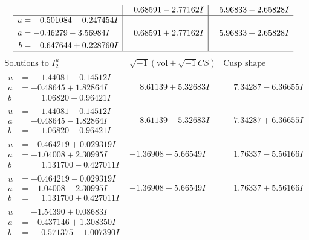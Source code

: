 \documentclass[1p]{elsarticle_modified}
\theoremstyle{definition}
\newcommand{\I}{\sqrt{-1}}
\begin{document}
$$\begin{array}{c|c|c}
 & \phantom{-}0.68591 - 2.77162 I & \phantom{-}5.96833 - 2.65828 I \\ \hline\begin{aligned}
u &= \phantom{-}0.501084 - 0.247454 I \\
a &= -0.46279 - 3.56984 I \\
b &= \phantom{-}0.647644 + 0.228760 I\end{aligned}
 & \phantom{-}0.68591 + 2.77162 I & \phantom{-}5.96833 + 2.65828 I\\
 \hline 
 \end{array}$$\newpage$$\begin{array}{c|c|c}  
\text{Solutions to }I^u_{2}& \I (\text{vol} + \sqrt{-1}CS) & \text{Cusp shape}\\
 \hline 
\begin{aligned}
u &= \phantom{-}1.44081 + 0.14512 I \\
a &= -0.48645 + 1.82864 I \\
b &= \phantom{-}1.06820 - 0.96421 I\end{aligned}
 & \phantom{-}8.61139 + 5.32683 I & \phantom{-}7.34287 - 6.36655 I \\ \hline\begin{aligned}
u &= \phantom{-}1.44081 - 0.14512 I \\
a &= -0.48645 - 1.82864 I \\
b &= \phantom{-}1.06820 + 0.96421 I\end{aligned}
 & \phantom{-}8.61139 - 5.32683 I & \phantom{-}7.34287 + 6.36655 I \\ \hline\begin{aligned}
u &= -0.464219 + 0.029319 I \\
a &= -1.04008 + 2.30995 I \\
b &= \phantom{-}1.131700 - 0.427011 I\end{aligned}
 & -1.36908 + 5.66549 I & \phantom{-}1.76337 - 5.56166 I \\ \hline\begin{aligned}
u &= -0.464219 - 0.029319 I \\
a &= -1.04008 - 2.30995 I \\
b &= \phantom{-}1.131700 + 0.427011 I\end{aligned}
 & -1.36908 - 5.66549 I & \phantom{-}1.76337 + 5.56166 I \\ \hline\begin{aligned}
u &= -1.54390 + 0.08683 I \\
a &= -0.437146 + 1.308350 I \\
b &= \phantom{-}0.571375 - 1.007390 I\end{aligned}

\end{array}$$
\end{document}
